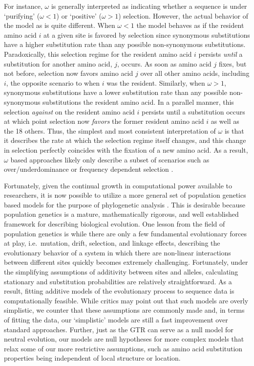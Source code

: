 \documentclass{article}
\begin{document}
For instance,  $\omega$ is generally interpreted as indicating whether a sequence is under `purifying' ($\omega < 1$) or `positive' ($\omega > 1$) selection.
However, the actual behavior of the model as is quite different.
When $\omega < 1$ the model behaves as if the resident amino acid $i$ at a given site is favored by selection since synonymous substitutions have a higher substitution rate than any possible non-synonymous substitutions.
Paradoxically, this selection regime for the resident amino acid $i$ persists \emph{until} a substitution for another amino acid, $j$, occurs.
As soon as amino acid $j$ fixes, but not before, selection now favors amino acid $j$ over all other amino acids, including $i$, the opposite scenario to when $i$ was the resident.
Similarly, when $\omega > 1$, synonymous substitutions have a lower substitution rate than any possible non-synonymous substitutions the resident amino acid.
In a parallel manner, this selection \emph{against} on the resident amino acid $i$ persists until a substitution occurs at which point selection now \emph{favors}  the former resident amino acid $i$ as well as the 18 others.
Thus, the simplest and most consistent interpretation of $\omega$ is that it describes the rate at which the selection regime itself changes, and this change in selection perfectly coincides with the fixation of a new amino acid.
As a result, $\omega$ based approaches likely only describe a subset of scenarios such as over/underdominance or frequency dependent selection  \citep{HughesAndNei1988,Nowak2006}.

Fortunately, given the continual growth in computational power available to researchers, it is now possible to utilize a more general set of population genetics based models for the purpose of phylogenetic analysis \citep[e.g.][]{HalpernAndBruno1998,RobinsonEtAl2003,LartillotAndPhilippe2004,RodrigueAndLartillot2014}.
This is desirable because population genetics is a mature, mathematically rigorous, and well established framework for describing biological evolution.
One lesson from the field of population genetics is while there are only a few fundamental evolutionary forces at play, i.e.~mutation, drift, selection, and linkage effects, describing the evolutionary behavior of a system in which there are non-linear interactions between different sites quickly becomes extremely challenging.
Fortunately, under the simplifying assumptions of additivity between sites and alleles, calculating stationary and substitution probabilities are relatively straightforward.
As a result, fitting additive models of the evolutionary process to sequence data is computationally feasible.
While critics may point out that such models are overly simplistic, we counter that these assumptions are commonly made and, in terms of fitting the data, our `simplistic' models are still a fast improvement over standard approaches.
Further, just as the GTR can serve as a null model for neutral evolution, our models are null hypotheses for more complex models that relax some of our more restrictive assumptions, such as amino acid substitution properties being independent of local structure or location.
\end{document}
